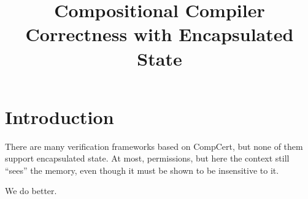 \documentclass[acmsmall,screen,review,anonymous]{acmart}
\title{Compositional Compiler Correctness with Encapsulated State}
\begin{document}
\maketitle

\newpage
\tableofcontents
\newpage

\section{Introduction} %

There are many verification frameworks based on CompCert,
but none of them support encapsulated state.
At most, permissions,
but here the context still ``sees'' the memory,
even though it must be shown to be insensitive to it.

We do better.

\end{document}
